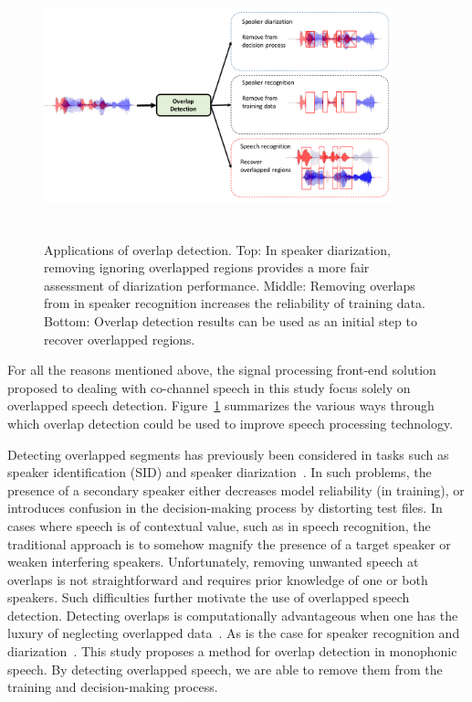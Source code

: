 \begin{figure}[t!]
	\centering
	\vspace{0mm}
	\includegraphics[height = 3in, width=0.9\textwidth]{figures/overlap_detection_applications}
	\vspace{-3mm}
	\caption{Applications of overlap detection. 
	Top: In speaker diarization, removing ignoring overlapped regions provides a more fair assessment of diarization performance. 
	Middle: Removing overlaps from in speaker recognition increases the reliability of training data.
	Bottom: Overlap detection results can be used as an initial step to recover overlapped regions.}
	\label{fig:pykno_blockdiag}
	\vspace{-3mm}
\end{figure}

For all the reasons mentioned above, the signal processing front-end solution proposed to dealing with co-channel speech in this study focus solely on overlapped speech detection. 
Figure~\ref{fig:pykno_blockdiag} summarizes the various ways through which overlap detection could be used to improve speech processing technology. 


Detecting overlapped segments has previously been considered in tasks such as speaker identification (SID) and speaker diarization~\cite{boakye_thesis,yantorno_report}. 
In such problems, the presence of a secondary speaker either decreases model reliability (in training), or introduces confusion in the decision-making process by distorting test files. 
In cases where speech is of contextual value, such as in speech recognition, the traditional approach is to somehow magnify the presence of a target speaker or weaken interfering speakers. 
Unfortunately, removing unwanted speech at overlaps is not straightforward and requires prior knowledge of one or both speakers. 
Such difficulties further motivate the use of overlapped speech detection. 
Detecting overlaps is computationally advantageous when one has the luxury of neglecting overlapped data~\cite{yantorno_report}. 
As is the case for speaker recognition and diarization~\cite{Boakye_is_08}. 
This study proposes a method for overlap detection in monophonic speech. 
By detecting overlapped speech, we are able to remove them from the training and decision-making process. 


